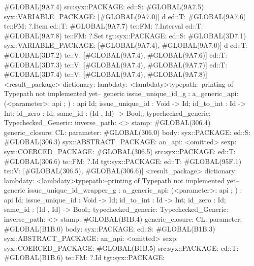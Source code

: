                 #GLOBAL(9A7.4)
                 src:syx::PACKAGE:
                        ed::S: #GLOBAL(9A7.5) syx::VARIABLE_PACKAGE: [#GLOBAL(9A7.0)] d
                        ed::T: #GLOBAL(9A7.6) te::FM: ?.Item
                        ed::T: #GLOBAL(9A7.7) te::FM: ?.Interval
                        ed::T: #GLOBAL(9A7.8) te::FM: ?.Set
                tgt:syx::PACKAGE:
                    ed::S: #GLOBAL(3D7.1)
                     syx::VARIABLE_PACKAGE:
                     [#GLOBAL(9A7.4), #GLOBAL(9A7.0)]
                     d
                    ed::T: #GLOBAL(3D7.2)
                     te::V:
                     [#GLOBAL(9A7.4), #GLOBAL(9A7.6)]
                    ed::T: #GLOBAL(3D7.3)
                     te::V:
                     [#GLOBAL(9A7.4), #GLOBAL(9A7.7)]
                    ed::T: #GLOBAL(3D7.4)
                     te::V:
                     [#GLOBAL(9A7.4), #GLOBAL(9A7.8)]
         <result_package>
dictionary:
lambdaty:
  <lambdaty>typepath:--printing of Typepath not implemented yet--
generic issue_unique_id_g
:
a_generic_api:
(<parameter>:
api {};
)
:
api {
    Id;
    issue_unique_id : Void -> Id;
    id_to_int : Id -> Int;
    id_zero : Id;
    same_id : (Id , Id) -> Bool;};
typechecked_generic:
Typechecked_Generic:
inverse_path: <>
stamp: #GLOBAL(306.4)
generic_closure:
CL:
parameter: #GLOBAL(306.0)
body: syx::PACKAGE:
        ed::S: #GLOBAL(306.3)
            syx::ABSTRACT_PACKAGE:
                an_api: <omitted>
                sexp:
                    syx::COERCED_PACKAGE:
                        #GLOBAL(306.5)
                         src:syx::PACKAGE:
                         ed::T: #GLOBAL(306.6) te::FM: ?.Id
                        tgt:syx::PACKAGE:
                         ed::T: #GLOBAL(95F.1) te::V: [#GLOBAL(306.5), #GLOBAL(306.6)]
         <result_package>
dictionary:
lambdaty:
  <lambdaty>typepath:--printing of Typepath not implemented yet--
generic issue_unique_id_wrapper_g
:
a_generic_api:
(<parameter>:
api {};
)
:
api {
    Id;
    issue_unique_id : Void -> Id;
    id_to_int : Id -> Int;
    id_zero : Id;
    same_id : (Id , Id) -> Bool;};
typechecked_generic:
Typechecked_Generic:
inverse_path: <>
stamp: #GLOBAL(B1B.4)
generic_closure:
CL:
parameter: #GLOBAL(B1B.0)
body: syx::PACKAGE:
        ed::S: #GLOBAL(B1B.3)
            syx::ABSTRACT_PACKAGE:
                an_api: <omitted>
                sexp:
                    syx::COERCED_PACKAGE:
                        #GLOBAL(B1B.5)
                         src:syx::PACKAGE:
                         ed::T: #GLOBAL(B1B.6) te::FM: ?.Id
                        tgt:syx::PACKAGE:
